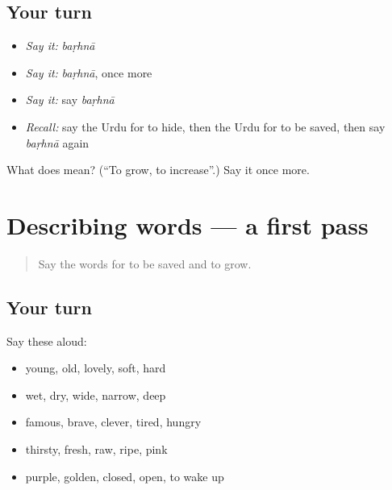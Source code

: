 \subsection*{Your turn}
\begin{itemize}
\raggedright
  \item \emph{Say it:} \emph{baṛhnā}
  \item \emph{Say it:} \emph{baṛhnā}, once more
  \item \emph{Say it:} say \emph{baṛhnā}
  \item \emph{Recall:} say the Urdu for to hide, then the Urdu for to be saved, then say \emph{baṛhnā} again
\end{itemize}

\begin{tcolorbox}[breakable,colback=teal!4,colframe=teal!35!black,title={Before you move on}]
What does  mean? (\textquotedblleft{}To grow, to increase\textquotedblright{}.) Say it once more.
\end{tcolorbox}
\section[(dialogue)]{Describing words — a first pass}

\label{lesson:UR-R142-first-pass-describing-words}



\begin{quote}
Say the words for to be saved and to grow.
\end{quote}

\subsection*{Your turn}
Say these aloud:

\begin{itemize}
\raggedright
  \item young, old, lovely, soft, hard
  \item wet, dry, wide, narrow, deep
  \item famous, brave, clever, tired, hungry
  \item thirsty, fresh, raw, ripe, pink
  \item purple, golden, closed, open, to wake up
\end{itemize}

